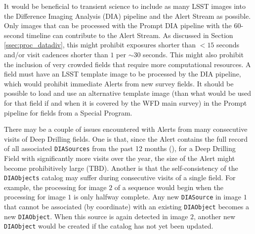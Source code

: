 \documentclass[DM,lsstdoc,toc]{lsstdoc}
\begin{document}
It would be beneficial to transient science to include as many LSST images into the Difference Imaging Analysis (DIA) pipeline and the Alert Stream as possible. Only images that can be processed with the Prompt DIA pipeline with the $60$-second timeline can contribute to the Alert Stream. As discussed in Section \ref{ssec:proc_datadiv}, this might prohibit exposures shorter than $<15$ seconds and/or visit cadences shorter than $1$ per $\sim30$ seconds. This might also prohibit the inclusion of very crowded fields that require more computational resources. A field must have an LSST template image to be processed by the DIA pipeline, which would prohibit immediate Alerts from new survey fields. It should be possible to load and use an alternative template image (than what would be used for that field if and when it is covered by the WFD main survey) in the Prompt pipeline for fields from a Special Program. 

There may be a couple of issues encountered with Alerts from many consecutive visits of Deep Drilling fields. One is that, since the Alert contains the full record of all associated {\tt DIASources} from the past 12 months (), for a Deep Drilling Field with significantly more visits over the year, the size of the Alert might become prohibitively large (TBD). Another is that the self-consistency of the \texttt{DIAObjects} catalog may suffer during consecutive visits of a single field. For example, the processing for image $2$ of a sequence would begin when the processing for image $1$ is only halfway complete. Any new {\tt DIASource} in image $1$ that cannot be associated (by coordinate) with an existing {\tt DIAObject} becomes a new {\tt DIAObject}. When this source is again detected in image $2$, another new {\tt DIAObject} would be created if the catalog has not yet been updated.

\end{document}
